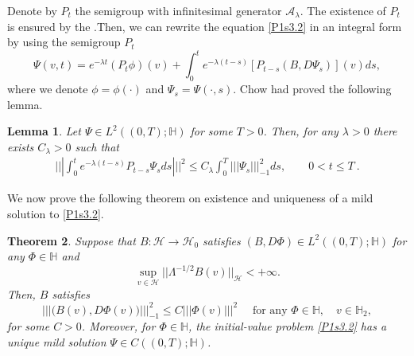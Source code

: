 \documentclass[]{interact}
\theoremstyle{plain}%
\newtheorem{theorem}{Theorem}[section]
\newtheorem{lemma}[theorem]{Lemma}
\theoremstyle{definition}
\theoremstyle{remark}
\begin{document}
        Denote by $P_t$ the semigroup with infinitesimal generator
    $\mathcal{A}_\lambda$. The existence of $P_t$ is ensured by the
    .Then, we can rewrite the equation \eqref{P1s3.2} in an 
    integral form by using the semigroup $P_t$
    \begin{equation}
        \Psi(v,t)=
            e^{-\lambda t} (P_t\phi)(v)
            +
            \int_0^t  e^{-\lambda(t-s)}[P_{t-s}(B,D\Psi_s)](v) ds,
    \end{equation}
    where we denote $\phi=\phi(\cdot)$ and $\Psi_s=\Psi(\cdot,s)$.
    Chow \cite{liu} had proved the following lemma.

    \begin{lemma}\label{Lemma.s3.1}
        Let $\Psi\in L^2((0,T);\mathbb{H})$ for some $T>0$. Then, for any
        $\lambda>0$ there exists $C_\lambda>0$ such that
         \begin{align}
            |||\int_0^t e^{-\lambda (t-s)} P_{t-s} \Psi_{s} ds |||^2 \le 
            C_\lambda
            \int_0^T |||\Psi_s|||_{-1}^2 ds,
            \qquad 0< t\le T
            \ .
            \label{s3.1.0}
         \end{align}
    \end{lemma}

    We now prove the following theorem on existence and uniqueness of a mild
    solution to \eqref{P1s3.2}.
    \begin{theorem}
        \label{Th-EU}
        Suppose that $B:\mathcal{H}\rightarrow \mathcal{H}_0$ satisfies
        $
            (B,D\Phi)\in
            L^2((0,T);\mathbb{H})
        $ for any $\Phi\in\mathbb{H}$ and
        $$
            \sup_{v\in \mathcal{H}} ||\Lambda^{-1/2}B(v)||_{\mathcal{H}}
                <+\infty.
        $$
        Then, $B$ satisfies
        \begin{equation}
            \label{s3.1.1}
            ||| \big(B(v),D\Phi(v) \big) |||_{-1}^2 
            \le C |||\Phi(v) |||^2  
            \quad
            \text{ for any } \Phi\in \mathbb{H},
            \quad v\in \mathbb{H}_2 ,
        \end{equation}
        for some $C>0$.
        Moreover, for $\Phi\in \mathbb{H}$, the initial-value problem
        \eqref{P1s3.2} has a unique mild solution
        $\Psi\in C((0,T); \mathbb{H})$.
    \end{theorem}
\end{document}
